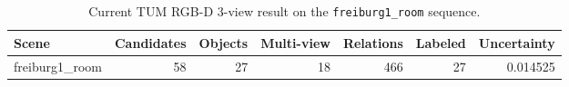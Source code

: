 \begin{table}[t]
\centering
\caption{Current TUM RGB-D 3-view result on the \texttt{freiburg1\_room} sequence.}
\label{tab:tum_rgbd_3view}
\begin{tabular}{lrrrrrr}
\toprule
Scene & Candidates & Objects & Multi-view & Relations & Labeled & Uncertainty \\
\midrule
freiburg1\_room & 58 & 27 & 18 & 466 & 27 & 0.014525 \\
\bottomrule
\end{tabular}
\end{table}
